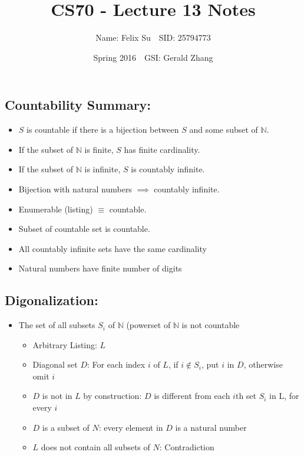 \documentclass{article}\usepackage{amsmath,amssymb,amsthm,tikz,tkz-graph,color,chngpage,soul,hyperref,csquotes,graphicx,floatrow, listings}\newcommand*{\QEDB}{\hfill\ensuremath{\square}}\newtheorem*{prop}{Proposition}\renewcommand{\theenumi}{\alph{enumi}}\usepackage[shortlabels]{enumitem}\usepackage[nobreak=true]{mdframed}\usetikzlibrary{matrix,calc}\MakeOuterQuote{"}\usepackage[margin=0.75in]{geometry} \newtheorem{theorem}{Theorem}\newcommand{\Z}{\mathbb Z}\newcommand{\R}{\mathbb R}\newcommand{\Q}{\mathbb Q}\newcommand{\N}{\mathbb N}
\title{CS70 - Lecture 13 Notes}
\author{Name: Felix Su$\quad$SID: 25794773}
\date{Spring 2016$\quad$GSI: Gerald Zhang}
\begin{document}
\maketitle

\subsection*{Countability Summary:}
\begin{itemize}
    \item $S$ is countable if there is a bijection between $S$ and some subset of $\N$.
    \item If the subset of $\N$ is finite, $S$ has finite cardinality.
    \item If the subset of $\N$ is infinite, $S$ is countably infinite.
    \item Bijection with natural numbers $\implies$ countably infinite.
    \item Enumerable (listing) $\equiv$ countable.
    \item Subset of countable set is countable.
    \item All countably infinite sets have the same cardinality
    \item Natural numbers have finite number of digits
\end{itemize}

\subsection*{Digonalization:}
\begin{itemize}
    \item The set of all subsets $S_i$ of $\N$ (powerset of $\N$ is not countable
    \begin{itemize}
        \item Arbitrary Listing: $L$
        \item Diagonal set $D$: For each index $i$ of $L$, if $i \not\in S_i$, put $i$ in $D$, otherwise omit $i$
        \item $D$ is not in $L$ by construction: $D$ is different from each $i$th set $S_i$ in L, for every $i$
        \item $D$ is a subset of $N$: every element in $D$ is a natural number
        \item $L$ does not contain all subsets of $N$: Contradiction
    \end{itemize}
\end{itemize}
\end{document}
